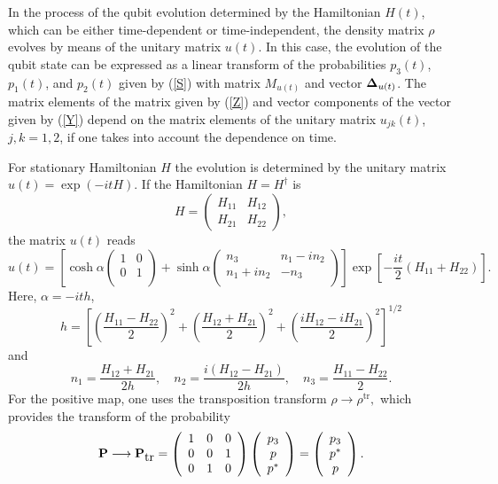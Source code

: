 \documentclass[12pt]{article}
\begin{document}
In the process of the qubit evolution determined by the Hamiltonian
$H(t)$, which can be either time-dependent or time-independent, the
density matrix $\rho$ evolves by means of the unitary matrix $u(t)$.
In this case, the evolution of the qubit state can be expressed as a
linear transform of the probabilities $p_3(t)$, $p_1(t)$, and
$p_2(t)$ given by (\ref{S}) with matrix $M_{u(t)}$ and vector ${\bf
\Delta}_{u(t)}$. The matrix elements of the matrix given by
(\ref{Z}) and vector components of the vector given by (\ref{Y})
depend on the matrix elements of the unitary matrix $u_{jk}(t)$,
$j,k=1,2$, if one takes into account the dependence on time.

For stationary Hamiltonian $H$ the evolution is determined by the
unitary matrix
$u(t)=\exp(-i t H).$
If the Hamiltonian $H=H^\dagger$ is
\begin{equation}\label{eq.A}
H=\left(\begin{array}{cc}
H_{11}&H_{12}\\H_{21}&H_{22}\end{array}\right),
\end{equation}
the matrix $u(t)$ reads
\begin{equation}\label{eq.b}
u(t)=\left[\cosh\alpha\left(\begin{array}{cc} 1&0\\0&1\\\end{array}\right)+
\sinh\alpha\left(\begin{array}{cc} n_3&n_1-in_2\\n_1+in_2&-n_3\\
\end{array}\right)\right]\exp\left[-\frac{it}{2}\left( H_{11}+H_{22}\right)\right].
\end{equation}
Here, $\alpha=-i t h $,
\[
h=\left[\left(\frac{H_{11}-H_{22}}{2}\right)^2+\left(\frac{H_{12}+H_{21}}{2}\right)^2
+\left(\frac{iH_{12}-iH_{21}}{2}\right)^2\right]^{1/2}
\]
and
\begin{equation}\label{eq.g}
n_1=\frac{H_{12}+H_{21}}{2h},\quad n_2=\frac{i(H_{12}-H_{21})}{2h},\quad n_3=\frac{H_{11}-H_{22}}{2}.
\end{equation}
For the positive map, one uses the transposition transform
$\rho\longrightarrow\rho^{\mbox{tr}},$ which provides the transform
of the probability
\begin{equation}
{\bf P}\longrightarrow{\bf P}_{\mbox{tr}}=\left(\begin{array}{ccc}
1&0&0\\
0&0&1\\
0&1&0
\end{array}\right)
\left(\begin{array}{ccc}
p_3\\p\\p^\ast\end{array}\right)=\left(\begin{array}{ccc}
p_3\\p^\ast\\p
\end{array}\right).
\end{equation}
\end{document}
